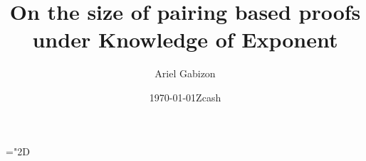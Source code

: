 \documentclass[11pt]{article}
\title{%
On the size of pairing based proofs under Knowledge of Exponent}
\date{\today}
\author{Ariel Gabizon}
\date{Zcash}
\numberwithin{figure}{section} %
\newcommand{\set}[1]{\ensuremath{\left\{#1\right\}}\xspace}
\begin{document}
\maketitle
 \mathchardef\mhyphen="2D

\newcommand{\G}{\ensuremath{{\mathbb G}}\xspace}
\newcommand{\Gstar}{\ensuremath{{\mathbb G}^*}\xspace}

\newcommand{\grouppair}{\ensuremath{G^*}\xspace}

\newcommand{\Gt}{\ensuremath{{\mathbb G}_t}\xspace}
\newcommand{\F}{\ensuremath{\mathbb F}\xspace}
\newcommand{\Fstar}{\ensuremath{\mathbb F^*}\xspace}

\newcommand{\help}[1]{$#1$-helper\xspace}
\newcommand{\randompair}[1]{\ensuremath{\mathsf{randomPair}(#1)}\xspace}
\newcommand{\pair}[1]{$#1$-pair\xspace}
\newcommand{\pairs}[1]{$#1$-pairs\xspace}

\newcommand{\pairone}[1]{\G1-$#1$-pair\xspace}
\newcommand{\pairtwo}[1]{\G2-$#1$-pair\xspace}
\newcommand{\sameratio}[2]{\ensuremath{\mathsf{SameRatio}(#1,#2)}\xspace}
\newcommand{\vecc}[2]{\ensuremath{(#1)_{#2}}\xspace}
\newcommand{\players}{\ensuremath{[n]}\xspace}
\newcommand{\adv}{\ensuremath{A}\xspace}
\newcommand{\advprime}{\ensuremath{A'}\xspace}
\newcommand{\extprime}{\ensuremath{E'}\xspace}
\newcommand{\advrand}{\ensuremath{\mathsf{rand}_{\adv}}\xspace}

\newcommand{\ci}{\ensuremath{\mathrm{CI}}\xspace}
\newcommand{\pairvec}[1]{$#1$-vector\xspace}
\newcommand{\Fq}{\ensuremath{\mathbb{F}_q}\xspace}
\newcommand{\randpair}[1]{\ensuremath{\mathsf{rp}_{#1}}\xspace}
\newcommand{\randpairone}[1]{\ensuremath{\mathsf{rp}_{#1}^{1}}\xspace}
\newcommand{\amid}{\ensuremath{A_{\mathrm{mid}}}\xspace}
\newcommand{\negl}{\ensuremath{\mathsf{negl}(\lambda)}\xspace}
\newcommand{\randpairtwo}[1]{\ensuremath{\mathsf{rp_{#1}^2}}\xspace}%

\newcommand{\rej}{\ensuremath{\mathsf{rej}}\xspace}
\newcommand{\acc}{\ensuremath{\mathsf{acc}}\xspace}
\newcommand{\sha}[1]{\ensuremath{\mathsf{COMMIT}(#1)}\xspace}
 \newcommand{\shaa}{\ensuremath{\mathsf{COMMIT}}\xspace}
 \newcommand{\comm}[1]{\ensuremath{\mathsf{comm}_{#1}}\xspace}
 \newcommand{\defeq}{:=}
\end{document}
